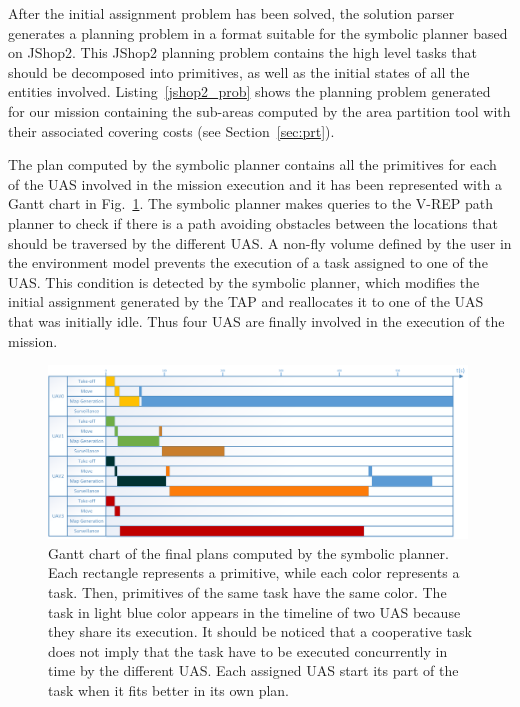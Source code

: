 \documentclass[twocolumn]{svjour3}          %
\begin{document}
After the initial assignment problem has been solved, the solution parser generates a planning problem in a format suitable for the symbolic planner based on JShop2. This JShop2 planning problem contains the high level tasks that should be decomposed into primitives, as well as the initial states of all the entities involved. Listing~\ref{jshop2_prob} shows the planning problem generated for our mission containing the sub-areas computed by the area partition tool with their associated covering costs (see Section~\ref{sec:prt}). 



The plan computed by the symbolic planner contains all the primitives for each of the UAS involved in the mission execution and it has been represented with a Gantt chart in Fig.~\ref{fig:sp_gantt_solution}. The symbolic planner makes queries to the V-REP path planner to check if there is a path avoiding obstacles between the locations that should be traversed by the different UAS. A non-fly volume defined by the user in the environment model prevents the execution of a task assigned to one of the UAS. This condition is detected by the symbolic planner, which modifies the initial assignment generated by the TAP and reallocates it to one of the UAS that was initially idle. Thus four UAS are finally involved in the execution of the mission.

\begin{figure}
    \centering
    \includegraphics[width=0.99\textwidth]{sp_gantt_solution.png}
    \caption[Gantt chart of the final plans computed by the symbolic planner.]{Gantt chart of the final plans computed by the symbolic planner. Each rectangle represents a primitive, while each color represents a task. Then, primitives of the same task have the same color. The task in light blue color appears in the timeline of two UAS because they share its execution. It should be noticed that a cooperative task does not imply that the task have to be executed concurrently in time by the different UAS. Each assigned UAS start its part of the task when it fits better in its own plan.}
    \label{fig:sp_gantt_solution}
\end{figure}
\end{document}
